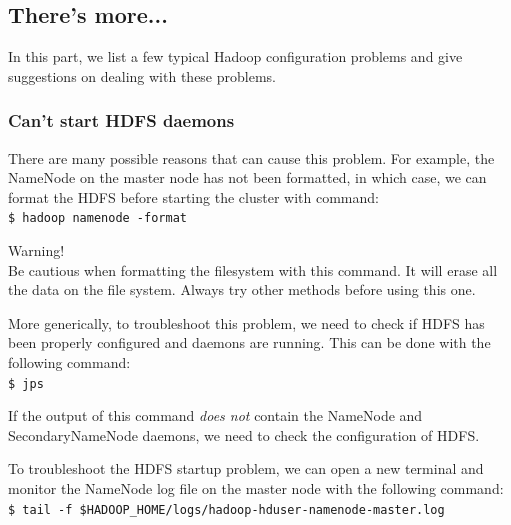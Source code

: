 \subsection*{There's more...}
In this part, we list a few typical Hadoop configuration problems and give suggestions on dealing with these problems.

\subsubsection*{Can't start HDFS daemons}
There are many possible reasons that can cause this problem. For example, the NameNode on the master node has not been formatted, in which case, we can format the HDFS before starting the cluster with command: \\
\verb|$ hadoop namenode -format|
\begin{warning}
Warning! \\
Be cautious when formatting the filesystem with this command. It will erase all the data on the file system. Always try other methods before using this one.
\end{warning}

More generically, to troubleshoot this problem, we need to check if HDFS has been properly configured and daemons are running. This can be done with the following command: \\
\verb|$ jps|

If the output of this command \emph{does not} contain the NameNode and SecondaryNameNode daemons, we need to check the configuration of HDFS.

To troubleshoot the HDFS startup problem, we can open a new terminal and monitor the NameNode log file on the master node with the following command:\\
\verb|$ tail -f $HADOOP_HOME/logs/hadoop-hduser-namenode-master.log|

